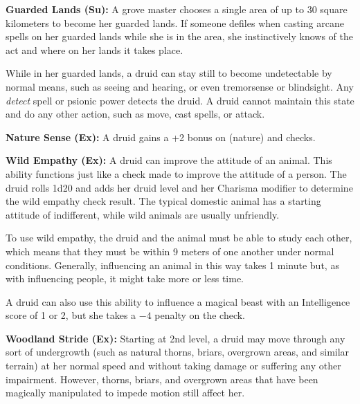 
\textbf{Guarded Lands (Su):} A grove master chooses a single area of up to 30 square kilometers to become her guarded lands. If someone defiles when casting arcane spells on her guarded lands while she is in the area, she instinctively knows of the act and where on her lands it takes place.

While in her guarded lands, a druid can stay still to become undetectable by normal means, such as seeing and hearing, or even tremorsense or blindsight. Any \emph{detect} spell or psionic power detects the druid. A druid cannot maintain this state and do any other action, such as move, cast spells, or attack.

\textbf{Nature Sense (Ex):} A druid gains a +2 bonus on  (nature) and  checks.

\textbf{Wild Empathy (Ex):} A druid can improve the attitude of an animal. This ability functions just like a  check made to improve the attitude of a person. The druid rolls 1d20 and adds her druid level and her Charisma modifier to determine the wild empathy check result. The typical domestic animal has a starting attitude of indifferent, while wild animals are usually unfriendly.

To use wild empathy, the druid and the animal must be able to study each other, which means that they must be within 9 meters of one another under normal conditions. Generally, influencing an animal in this way takes 1 minute but, as with influencing people, it might take more or less time.

A druid can also use this ability to influence a magical beast with an Intelligence score of 1 or 2, but she takes a $-4$ penalty on the check.

\textbf{Woodland Stride (Ex):} Starting at 2nd level, a druid may move through any sort of undergrowth (such as natural thorns, briars, overgrown areas, and similar terrain) at her normal speed and without taking damage or suffering any other impairment. However, thorns, briars, and overgrown areas that have been magically manipulated to impede motion still affect her.

